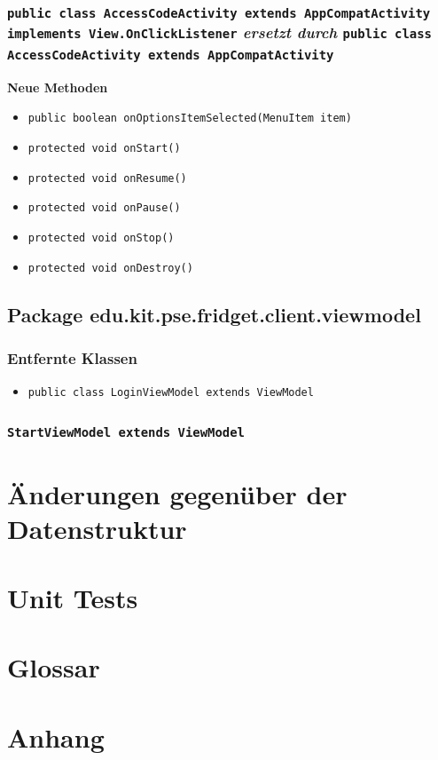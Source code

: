 \documentclass[a4paper]{scrreprt}
\begin{document}
		\subsection{\texttt{public class AccessCodeActivity extends AppCompatActivity implements View.OnClickListener} \textit{ersetzt durch} \texttt{public class AccessCodeActivity extends AppCompatActivity}}
		\textbf{Neue Methoden}
		\begin{itemize}
			\item \texttt{public boolean onOptionsItemSelected(MenuItem item)}
			\item \texttt{protected void onStart()}
			\item \texttt{protected void onResume()}
			\item \texttt{protected void onPause()}
			\item \texttt{protected void onStop()}
			\item \texttt{protected void onDestroy()}
		\end{itemize}
	
	\section{Package edu.kit.pse.fridget.client.viewmodel}
		\subsection{Entfernte Klassen}
		\begin{itemize}
			\item \texttt{public class LoginViewModel extends ViewModel}
		\end{itemize}
	
		\subsection{\texttt{StartViewModel extends ViewModel}}
		
		
	
		
		\chapter{Änderungen gegenüber der Datenstruktur}
		
		\chapter{Unit Tests}
		
		
		\chapter{Glossar}
		
		\chapter{Anhang}
\end{document}
